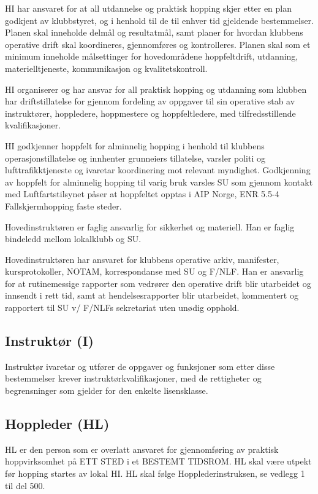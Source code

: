 HI har ansvaret for at all utdannelse og praktisk hopping skjer etter en plan godkjent av klubbstyret, og i henhold til de til enhver tid gjeldende bestemmelser. Planen skal inneholde delmål og resultatmål, samt planer for hvordan klubbens operative drift skal koordineres, gjennomføres og kontrolleres. Planen skal som et minimum inneholde målsettinger for hovedområdene hoppfeltdrift, utdanning, materielltjeneste, kommunikasjon og kvalitetskontroll.

HI organiserer og har ansvar for all praktisk hopping og utdanning som klubben har driftstillatelse for gjennom fordeling av oppgaver til sin operative stab av instruktører, hoppledere, hoppmestere og hoppfeltledere, med tilfredsstillende kvalifikasjoner.

HI godkjenner hoppfelt for alminnelig hopping i henhold til klubbens operasjonstillatelse og innhenter grunneiers tillatelse, varsler politi og lufttrafikktjeneste og ivaretar koordinering mot relevant myndighet. Godkjenning av hoppfelt for alminnelig hopping til varig bruk varsles SU som gjennom kontakt med Luftfartstilsynet påser at hoppfeltet opptas i AIP Norge, ENR 5.5-4 Fallskjermhopping faste steder.

Hovedinstruktøren er faglig ansvarlig for sikkerhet og materiell. Han er faglig bindeledd mellom lokalklubb og SU.

Hovedinstruktøren har ansvaret for klubbens operative arkiv, manifester, kursprotokoller, NOTAM, korrespondanse med SU og F/NLF. Han er ansvarlig for at rutinemessige rapporter som vedrører den operative drift blir utarbeidet og innsendt i rett tid, samt at hendelsesrapporter blir utarbeidet, kommentert og rapportert til SU v/ F/NLFs sekretariat uten unødig opphold.

\subsection{Instruktør (I)}
Instruktør ivaretar og utfører de oppgaver og funksjoner som etter disse bestemmelser krever instruktørkvalifikasjoner, med de rettigheter og begrensninger som gjelder for den enkelte lisensklasse.

\subsection{Hoppleder (HL)}
HL er den person som er overlatt ansvaret for gjennomføring av praktisk hoppvirksomhet på ETT STED i et BESTEMT TIDSROM. HL skal være utpekt før hopping startes av lokal HI. HL skal følge Hopplederinstruksen, se vedlegg 1 til del 500.

